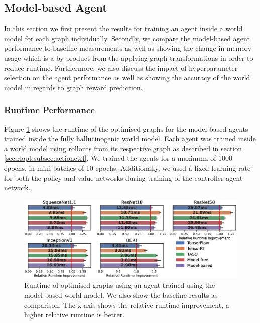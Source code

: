 \subsection{Model-based Agent}
\label{sec:eval:subsec:mbagent}

In this section we first present the results for training an agent inside a world model for each graph individually. Secondly, we compare the model-based agent performance to baseline measurements as well as showing the change in memory usage which is a by product from the applying graph transformations in order to reduce runtime. Furthermore, we also discuss the impact of hyperparameter selection on the agent performance as well as showing the accuracy of the world model in regards to graph reward prediction.

\subsubsection{Runtime Performance}
\label{sec:eval:subsec:mb:sec:runtimeperf}

Figure \ref{fig:eval:world-model-runtimes} shows the runtime of the optimised graphs for the model-based agents trained inside the fully hallucinogenic world model. Each agent was trained inside a world model using rollouts from its respective graph as described in section \ref{sec:rlopt:subsec:actionctrl}. We trained the agents for a maximum of 1000 epochs, in mini-batches of 10 epochs. Additionally, we used a fixed learning rate for both the policy and value networks during training of the controller agent network.

\begin{figure}[h]
  \centering
  \includegraphics[width=1\columnwidth]{sections/5evaluation/images/runtimes_all_h}
  \caption[Runtimes of optimised graphs using a model-based controller]{Runtime of optimised graphs using an agent trained using the model-based world model. We also show the baseline results as comparison. The x-axis shows the relative runtime improvement, a higher relative runtime is better.}
  \label{fig:eval:world-model-runtimes}
\end{figure}

